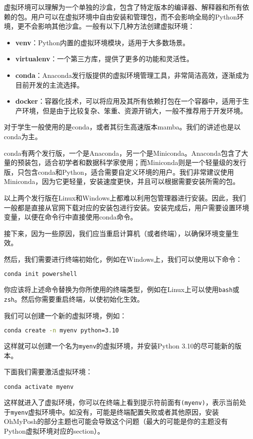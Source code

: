 虚拟环境可以理解为一个单独的沙盒，包含了特定版本的编译器、解释器和所有依赖的包。用户可以在虚拟环境中自由安装和管理包，而不会影响全局的Python环境，更不会影响其他沙盒。一般有以下几种方法创建虚拟环境：
\begin{itemize}
  \item \textbf{venv}：Python内置的虚拟环境模块，适用于大多数场景。
  \item \textbf{virtualenv}：一个第三方库，提供了更多的功能和灵活性。
  \item \textbf{conda}：Anaconda发行版提供的虚拟环境管理工具，非常简洁高效，逐渐成为目前开发的主流选择。
  \item \textbf{docker}：容器化技术，可以将应用及其所有依赖打包在一个容器中，适用于生产环境，但是由于比较复杂、笨重、资源开销大，一般不推荐用于开发环境。
\end{itemize}

对于学生一般使用的是conda，或者其衍生高速版本mamba。我们的讲述也是以conda为主。

conda有两个发行版，一个是Anaconda，另一个是Miniconda。Anaconda包含了大量的预装包，适合初学者和数据科学家使用；而Miniconda则是一个轻量级的发行版，只包含conda和Python，适合需要自定义环境的用户。我们非常建议使用Miniconda，因为它更轻量，安装速度更快，并且可以根据需要安装所需的包。

以上两个发行版在Linux和Windows上都难以利用包管理器进行安装。因此，我们一般都是直接从官网下载对应的安装包进行安装。安装完成后，用户需要设置环境变量，以便在命令行中直接使用conda命令。

接下来，因为一些原因，我们应当重启计算机（或者终端），以确保环境变量生效。

然后，我们需要进行终端初始化，例如在Windows上，我们可以使用以下命令：
\begin{lstlisting}[language=bash]
    conda init powershell
\end{lstlisting}

你应该将上述命令替换为你所使用的终端类型，例如在Linux上可以使用\texttt{bash}或\texttt{zsh}。然后你需要重启终端，以使初始化生效。

我们可以创建一个新的虚拟环境，例如：
\begin{lstlisting}[language=bash]
    conda create -n myenv python=3.10
\end{lstlisting}
这样就可以创建一个名为\texttt{myenv}的虚拟环境，并安装Python 3.10的尽可能新的版本。

下面我们需要激活虚拟环境：
\begin{lstlisting}[language=bash]
    conda activate myenv
\end{lstlisting}
这样就进入了虚拟环境，你可以在终端上看到提示符前面有\texttt{(myenv)}，表示当前处于\texttt{myenv}虚拟环境中。如没有，可能是终端配置失败或者其他原因，安装OhMyPosh的部分主题也可能会导致这个问题（最大的可能是你的主题没有Python虚拟环境对应的section）。

